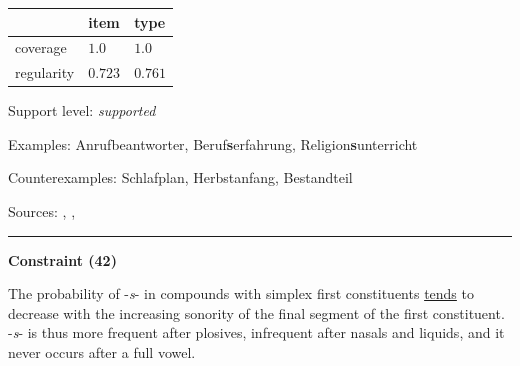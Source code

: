 \vspace{-0.35em}

\begin{table}[!ht]
\begin{center}

\begin{tabularx}{\columnwidth}{|X|X|X|}
\hline
 & item & type \\
\hline
 coverage & $1.0$ & $1.0$ \\
\hline
 regularity & $0.723$ & $0.761$ \\
\hline
\end{tabularx}
\end{center}
\end{table}

\vspace{-1.35em}

\noindent
Support level: \textit{supported}

\vspace{0.3em}

\noindent
Examples: Anruf{\zeroLinker}beantworter, Beruf\textbf{s}erfahrung, Religion\textbf{s}unterricht

\noindent
Counterexamples: Schlaf{\zeroLinker}plan, Herbst{\zeroLinker}anfang, Bestand{\zeroLinker}teil

\vspace{0.3em}

\noindent
Sources: \citet[572]{fuhrhop_kuerschner_2015}, \citet[10, 21, 22]{nuebling_szczepaniak_2008}, \citet[78]{nuebling_szczepaniak_2013}


\hrule




\vspace{0.4em}

\begin{center}
\textbf{Constraint (42)}
\end{center}

\noindent
The probability of -\textit{s}- in compounds with simplex first constituents \underline{tends} to decrease with the increasing sonority of the final segment of the first constituent. -\textit{s}- is thus more frequent after plosives, infrequent after nasals and liquids, and it never occurs after a full vowel.
\vspace{0.35em}


